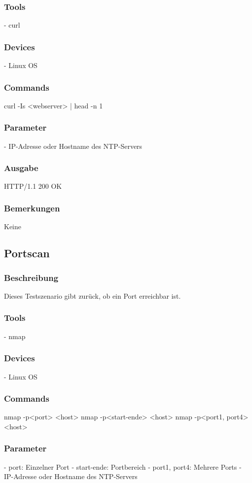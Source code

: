 \documentclass[a4,12pt]{scrartcl}
\begin{document}
\subsubsection{Tools}
- curl
\subsubsection{Devices}
- Linux OS
\subsubsection{Commands}
curl -Is <webserver> | head -n 1
\subsubsection{Parameter}
- IP-Adresse oder Hostname des NTP-Servers
\subsubsection{Ausgabe}
HTTP/1.1 200 OK
\subsubsection{Bemerkungen}
Keine

\subsection{Portscan}
\subsubsection{Beschreibung}
Dieses Testszenario gibt zurück, ob ein Port erreichbar ist.
\subsubsection{Tools}
- nmap
\subsubsection{Devices}
- Linux OS
\subsubsection{Commands}
nmap -p<port> <host>\newline
nmap -p<start-ende> <host>\newline
nmap -p<port1, port4> <host>\newline
\subsubsection{Parameter}
- port: Einzelner Port\newline
- start-ende: Portbereich\newline
- port1, port4: Mehrere Ports\newline
- IP-Adresse oder Hostname des NTP-Servers\newline
\end{document}
